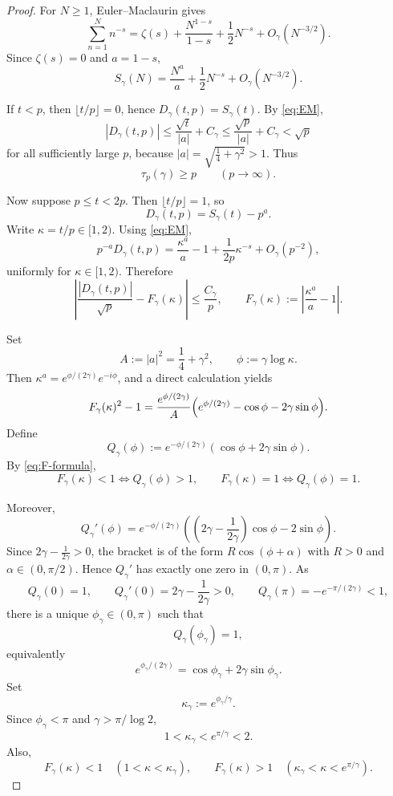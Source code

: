 \begin{proof}
For \(N\ge 1\), Euler--Maclaurin gives
\[
\sum_{n=1}^N n^{-s}
=
\zeta(s)+\frac{N^{1-s}}{1-s}+\frac12 N^{-s}+O_\gamma(N^{-3/2}).
\]
Since \(\zeta(s)=0\) and \(a=1-s\),
\begin{equation}
S_\gamma(N)=\frac{N^a}{a}+\frac12 N^{-s}+O_\gamma(N^{-3/2}).
\label{eq:EM}
\end{equation}

If \(t<p\), then \(\lfloor t/p\rfloor=0\), hence \(D_\gamma(t,p)=S_\gamma(t)\). By
\eqref{eq:EM},
\[
|D_\gamma(t,p)|
\le \frac{\sqrt t}{|a|}+C_\gamma
\le \frac{\sqrt p}{|a|}+C_\gamma<\sqrt p
\]
for all sufficiently large \(p\), because \(|a|=\sqrt{\frac14+\gamma^2}>1\). Thus
\begin{equation}
\tau_p(\gamma)\ge p
\qquad (p\to\infty).
\label{eq:before-p}
\end{equation}

Now suppose \(p\le t<2p\). Then \(\lfloor t/p\rfloor=1\), so
\[
D_\gamma(t,p)=S_\gamma(t)-p^a.
\]
Write \(\kappa=t/p\in[1,2)\). Using \eqref{eq:EM},
\[
p^{-a}D_\gamma(t,p)
=
\frac{\kappa^a}{a}-1+\frac{1}{2p}\kappa^{-s}+O_\gamma(p^{-2}),
\]
uniformly for \(\kappa\in[1,2)\). Therefore
\begin{equation}
\left|
\frac{|D_\gamma(t,p)|}{\sqrt p}-F_\gamma(\kappa)
\right|
\le \frac{C_\gamma}{p},
\qquad
F_\gamma(\kappa):=\left|\frac{\kappa^a}{a}-1\right|.
\label{eq:profile}
\end{equation}

Set
\[
A:=|a|^2=\frac14+\gamma^2,
\qquad
\phi:=\gamma\log\kappa.
\]
Then \(\kappa^a=e^{\phi/(2\gamma)}e^{-i\phi}\), and a direct calculation yields
\begin{equation}
F_\gamma(\kappa)^2-1
=
\frac{e^{\phi/(2\gamma)}}{A}
\Bigl(e^{\phi/(2\gamma)}-\cos\phi-2\gamma\sin\phi\Bigr).
\label{eq:F-formula}
\end{equation}
Define
\[
Q_\gamma(\phi):=e^{-\phi/(2\gamma)}(\cos\phi+2\gamma\sin\phi).
\]
By \eqref{eq:F-formula},
\[
F_\gamma(\kappa)<1 \iff Q_\gamma(\phi)>1,
\qquad
F_\gamma(\kappa)=1 \iff Q_\gamma(\phi)=1.
\]

Moreover,
\[
Q_\gamma'(\phi)
=
e^{-\phi/(2\gamma)}
\left(
\left(2\gamma-\frac{1}{2\gamma}\right)\cos\phi-2\sin\phi
\right).
\]
Since \(2\gamma-\frac1{2\gamma}>0\), the bracket is of the form
\(R\cos(\phi+\alpha)\) with \(R>0\) and \(\alpha\in(0,\pi/2)\). Hence
\(Q_\gamma'\) has exactly one zero in \((0,\pi)\). As
\[
Q_\gamma(0)=1,\qquad
Q_\gamma'(0)=2\gamma-\frac1{2\gamma}>0,\qquad
Q_\gamma(\pi)=-e^{-\pi/(2\gamma)}<1,
\]
there is a unique \(\phi_\gamma\in(0,\pi)\) such that
\[
Q_\gamma(\phi_\gamma)=1,
\]
equivalently
\begin{equation}
e^{\phi_\gamma/(2\gamma)}
=
\cos\phi_\gamma+2\gamma\sin\phi_\gamma.
\label{eq:def-phi}
\end{equation}
Set
\[
\kappa_\gamma:=e^{\phi_\gamma/\gamma}.
\]
Since \(\phi_\gamma<\pi\) and \(\gamma>\pi/\log 2\),
\[
1<\kappa_\gamma<e^{\pi/\gamma}<2.
\]
Also,
\begin{equation}
F_\gamma(\kappa)<1 \quad (1<\kappa<\kappa_\gamma),
\qquad
F_\gamma(\kappa)>1 \quad (\kappa_\gamma<\kappa<e^{\pi/\gamma}).
\label{eq:sign}
\end{equation}


\end{proof}

